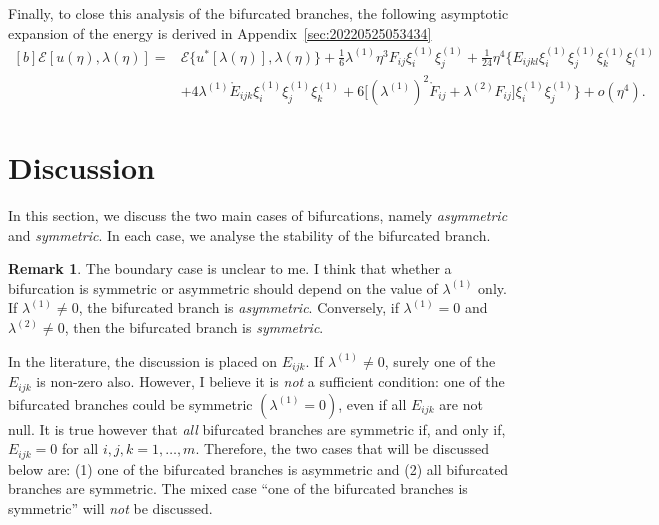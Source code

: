 \documentclass[12pt, final]{scrartcl}
\theoremstyle{definition}
\newtheorem{remark}{Remark}
\newcommand{\E}{\mathcal E}
\newcommand{\order}[2][1]{#2^{(#1)}}
\begin{document}
Finally, to close this analysis of the bifurcated branches, the following
asymptotic expansion of the energy is derived in
Appendix~\ref{sec:20220525053434}
\begin{equation}
  \label{eq:20220525053600}
  \begin{aligned}[b]
    \E[u(η), \lambda(η)] ={} & \E\{u^{\ast}[\lambda(η)], \lambda(η)\} + \tfrac{1}{6} \order[1]\lambda η^3 F_{i j} \order[1]{ξ_i} \order[1]{ξ_j} + \tfrac{1}{24} η^4 \bigl\{E_{ijkl} \order[1]{ξ_i} \order[1]{ξ_j} \order[1]{ξ_k} \order[1]{ξ_l}\\
    & + 4\order[1]\lambda \mathring{E}_{ijk} \order[1]{ξ_i} \order[1]{ξ_j} \order[1]{ξ_k} + 6 \bigl[( \order[1]\lambda )^2 \mathring{F}_{ij} + \order[2]\lambda F_{ij}\bigr] \order[1]{ξ_i} \order[1]{ξ_j}\bigr\} + o(η^4).
  \end{aligned}
\end{equation}

\section{Discussion}

In this section, we discuss the two main cases of bifurcations, namely
\emph{asymmetric} and \emph{symmetric}. In each case, we analyse the stability
of the bifurcated branch.

\begin{remark}
  The boundary case is unclear to me. I think that whether a bifurcation is
  symmetric or asymmetric should depend on the value of $\order[1]\lambda$ only. If
  $\order[1]\lambda ≠ 0$, the bifurcated branch is \emph{asymmetric}. Conversely, if
  $\order[1]\lambda = 0$ and $\order[2]\lambda ≠ 0$, then the bifurcated branch is \emph{symmetric}.

  In the literature, the discussion is placed on $E_{ijk}$. If $\order[1]\lambda ≠ 0$,
  surely one of the $E_{ijk}$ is non-zero also. However, I believe it is
  \emph{not} a sufficient condition: one of the bifurcated branches could be
  symmetric $(\order[1]\lambda = 0)$, even if all $E_{ijk}$ are not null. It is true
  however that \emph{all} bifurcated branches are symmetric if, and only if,
  $E_{ijk}=0$ for all $i, j, k = 1, \ldots, m$. Therefore, the two cases
  that will be discussed below are: (1) one of the bifurcated branches is
  asymmetric and (2) all bifurcated branches are symmetric. The mixed case ``one
  of the bifurcated branches is symmetric'' will \emph{not} be discussed.
\end{remark}
\end{document}

